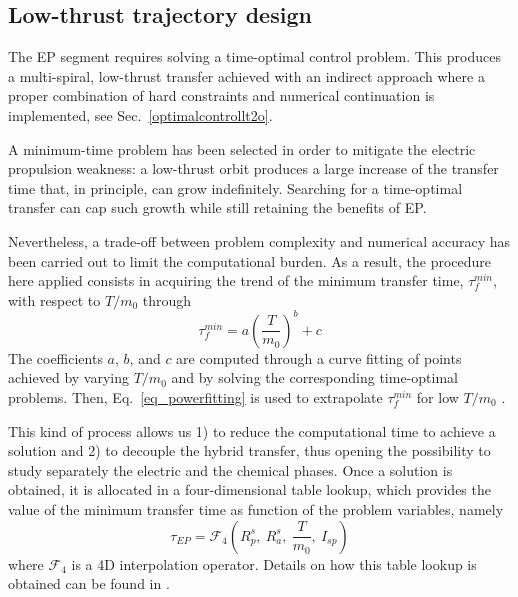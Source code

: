 \subsection{Low-thrust trajectory design}
\label{subsec:low-thrusttrajectory}
The EP segment requires solving a time-optimal control problem. This produces a multi-spiral, low-thrust transfer achieved with an indirect approach where a proper combination of hard constraints and numerical continuation is implemented, see Sec.\ \ref{optimalcontrollt2o}. 

A minimum-time problem has been selected in order to mitigate the electric propulsion weakness: a low-thrust orbit produces a large increase of the transfer time that, in principle, can grow indefinitely. Searching for a time-optimal transfer can cap such growth while still retaining the benefits of EP. 

Nevertheless, a trade-off between problem complexity and numerical accuracy has been carried out to limit the computational burden. As a result, the procedure here applied consists in acquiring the trend of the minimum transfer time, $\tau^{min}_f$, with respect to $T/m_0$ through 
%
\begin{equation}
\label{eq_powerfitting}
\tau^{min}_f = a \left(\frac{T}{m_0}\right)^{b} + c
\end{equation}
%
The coefficients $a$, $b$, and $c$ are computed through a curve fitting of points achieved by varying $T/m_0$ and by solving the corresponding time-optimal problems. Then, Eq.\ \eqref{eq_powerfitting} is used to extrapolate $\tau^{min}_f$ for low $T/m_0$ \cite{tesiluca, graham2015minimum,tesisimo}.
%

This kind of process allows us 1) to reduce the computational time to achieve a solution and 2) to decouple the hybrid transfer, thus opening the possibility to study separately the electric and the chemical phases. Once a solution is obtained, it is allocated in a four-dimensional table lookup, which provides the value of the minimum transfer time as function of the problem variables, namely
\begin{equation}
\tau_{EP} = \mathcal{F}_4 \left( R^s_p, ~R^s_a, ~\frac{T}{m_0}, ~I_{sp}\right)
\label{eq:fourtablelookup}
\end{equation}
%
where $\mathcal{F}_4$ is a 4D interpolation operator. Details on how this table lookup is obtained can be found in \cite{tesisimo}.
